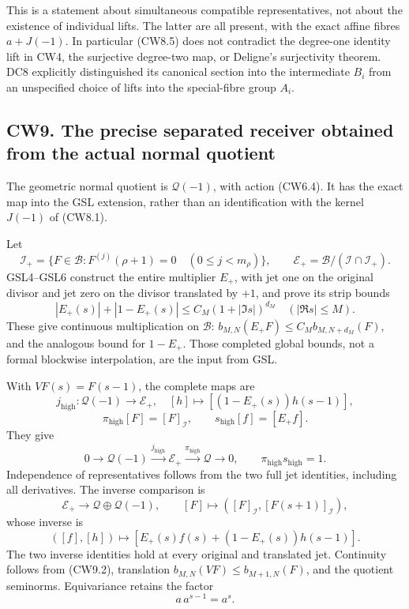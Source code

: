 This is a statement about simultaneous compatible representatives, not
about the existence of individual lifts. The latter are all present,
with the exact affine fibres \(a+J(-1)\). In particular (CW8.5) does not
contradict the degree-one identity lift in CW4, the surjective
degree-two map, or Deligne's surjectivity theorem. DC8 explicitly
distinguished its canonical section into the intermediate \(B_i\) from
an unspecified choice of lifts into the special-fibre group \(A_i\).

\subsection{CW9. The precise separated receiver obtained from the actual
normal
quotient}\label{cw9.-the-precise-separated-receiver-obtained-from-the-actual-normal-quotient}

The geometric normal quotient is \(\mathcal Q(-1)\), with action
(CW6.4). It has the exact map into the GSL extension, rather than an
identification with the kernel \(J(-1)\) of (CW8.1).

Let \[
\mathcal I_+=\{F\in\mathcal B:
F^{(j)}(\rho+1)=0\quad(0\le j<m_\rho)\},\qquad
\mathcal E_+=\mathcal B/(\mathcal I\cap\mathcal I_+).
\tag{CW9.1}
\] GSL4--GSL6 construct the entire multiplier \(E_+\), with jet one on
the original divisor and jet zero on the divisor translated by \(+1\),
and prove its strip bounds \[
|E_+(s)|+|1-E_+(s)|
\le C_M(1+|\Im s|)^{d_M}\quad(|\Re s|\le M).
\tag{CW9.2}
\] These give continuous multiplication on \(\mathcal B\):
\(b_{M,N}(E_+F)\le C_M b_{M,N+d_M}(F)\), and the analogous bound for
\(1-E_+\). Those completed global bounds, not a formal blockwise
interpolation, are the input from GSL.

With \(VF(s)=F(s-1)\), the complete maps are \[
j_{\mathrm{high}}:\mathcal Q(-1)\to\mathcal E_+,\quad
[h]\mapsto[(1-E_+(s))h(s-1)],
\] \[
\pi_{\mathrm{high}}[F]=[F]_{\mathcal I},\qquad
s_{\mathrm{high}}[f]=[E_+f].
\tag{CW9.3}
\] They give \[
0\to\mathcal Q(-1)\xrightarrow{j_{\mathrm{high}}}
\mathcal E_+\xrightarrow{\pi_{\mathrm{high}}}\mathcal Q\to0,
\qquad \pi_{\mathrm{high}}s_{\mathrm{high}}=1.
\tag{CW9.4}
\] Independence of representatives follows from the two full jet
identities, including all derivatives. The inverse comparison is \[
\mathcal E_+\longrightarrow\mathcal Q\oplus\mathcal Q(-1),
\qquad
[F]\longmapsto([F]_{\mathcal I},[F(s+1)]_{\mathcal I}),
\tag{CW9.5}
\] whose inverse is \[
([f],[h])\longmapsto
[E_+(s)f(s)+(1-E_+(s))h(s-1)].
\tag{CW9.6}
\] The two inverse identities hold at every original and translated jet.
Continuity follows from (CW9.2), translation
\(b_{M,N}(VF)\le b_{M+1,N}(F)\), and the quotient seminorms.
Equivariance retains the factor \[
a\,a^{s-1}=a^s.
\tag{CW9.7}
\]

